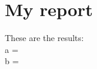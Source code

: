 \documentclass[11pt]{article}
\begin{document}
\section{My report}

These are the results:\\
a =  \\
b = 
\end{document}
